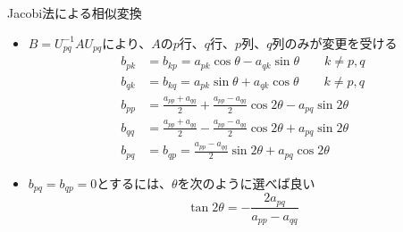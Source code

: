 \begin{frame}[t,fragile]{Jacobi法による相似変換}
  \begin{itemize}
    \setlength{\itemsep}{1em}
  \item $B=U_{pq}^{-1} A U_{pq}$により、$A$の$p$行、$q$行、$p$列、$q$列のみが変更を受ける
    \begin{align*}
      b_{pk} &= b_{kp} = a_{pk} \cos \theta - a_{qk} \sin \theta \qquad k \ne p,q \\
      b_{qk} &= b_{kq} = a_{pk} \sin \theta + a_{qk} \cos \theta \qquad k \ne p,q \\
      b_{pp} &= \frac{a_{pp}+a_{qq}}{2} + \frac{a_{pp}-a_{qq}}{2} \cos 2 \theta - a_{pq} \sin 2 \theta \\
      b_{qq} &= \frac{a_{pp}+a_{qq}}{2} - \frac{a_{pp}-a_{qq}}{2} \cos 2 \theta + a_{pq} \sin 2 \theta \\
      b_{pq} &= b_{qp} = \frac{a_{pp}-a_{qq}}{2} \sin 2 \theta + a_{pq} \cos 2 \theta
    \end{align*}
  \item $b_{pq} = b_{qp} = 0$とするには、$\theta$を次のように選べば良い
    \[
    \tan 2 \theta = - \frac{2 a_{pq}}{a_{pp}-a_{qq}}
    \]
  \end{itemize}
\end{frame}
